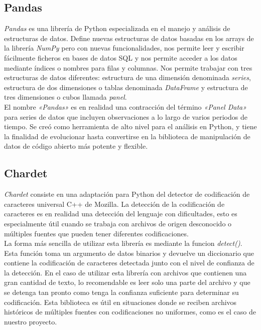 \documentclass[a4paper, 12pt]{book}
\begin{document}
\subsection{Pandas}
\label{subsec:pandas}
\textit{Pandas} es una librería de Python especializada en el manejo y análisis de estructuras de datos. Define nuevas estructuras de datos basadas en los arrays de la librería \textit{NumPy} pero
con nuevas funcionalidades, nos permite leer y escribir fácilmente ficheros en bases de datos SQL y nos permite acceder a los datos mediante índices o nombres para filas y columnas.
Nos permite trabajar con tres estructuras de datos diferentes: estructura de una dimensión denominada \textit{series}, estructura de dos dimensiones o tablas denominada \textit{DataFrame} y estructura
de tres dimensiones o cubos llamada \textit{panel}.
\\El nombre \textit{«Pandas»} es en realidad una contracción del término \textit{«Panel Data»} para series de datos que incluyen observaciones a lo largo de varios periodos de tiempo. Se creó como herramienta
de alto nivel para el análisis en Python, y tiene la finalidad de evolucionar hasta convertirse en la biblioteca de manipulación de datos de código abierto más potente y flexible.

\subsection{Chardet}
\label{subsec:chardet}

\textit{Chardet} consiste en una adaptación para Python del detector de codificación de caracteres universal C++ de Mozilla. La detección de la codificación de caracteres es en realidad una detección del lenguaje
con dificultades, esto es especialmente útil cuando se trabaja con archivos de origen desconocido o múltiples fuentes que pueden tener diferentes codificaciones.
\\La forma más sencilla de utilizar esta librería es mediante la funcion \textit{detect()}. Esta función toma un argumento de datos binarios y devuelve un diccionario que contiene la codificación de caracteres detectada
junto con el nivel de confianza de la detección. En el caso de utilizar esta librería con archivos que contienen una gran cantidad de texto, lo recomendable es leer solo una parte del archivo y que se detenga tan pronto
como tenga la confianza suficiente para determinar su codificación. Esta biblioteca es útil en situaciones donde se reciben archivos históricos de múltiples fuentes con codificaciones no uniformes, como es el caso de nuestro proyecto.
\end{document}
